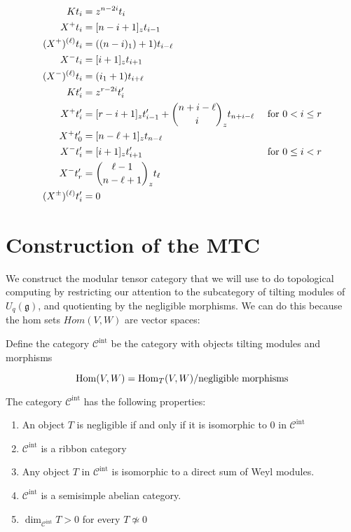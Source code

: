 \begin{align*}
    Kt_i &= z^{n-2i} t_i \\
    X^+ t_i &= [n-i+1]_z t_{i-1} \\
    (X^+)^{(\ell)} t_i &= ( (n-i)_1) + 1) t_{i-\ell} \\
    X^-t_i &= [i+1]_z t_{i+1} \\
    (X^-)^{(\ell)} t_i &= ( i_1 + 1) t_{i+\ell} \\
    Kt'_i &= z^{r-2i} t'_i \\
    X^+ t'_i &= [r-i+1]_z t'_{i-1}  + \dbinom{n + i - \ell}{i}_z t_{n+i-\ell} &\text{ for $0 < i \leq r$}\\
    X^+ t'_0 &= [n - \ell + 1]_z t_{n-\ell} \\
    X^-t'_i &= [i+1]_z t'_{i+1} &\text{ for $0 \leq i < r$}\\
    X^- t'_r &= \dbinom{\ell - 1}{n - \ell + 1}_z t_\ell \\
    (X^\pm)^{(\ell)} t'_i  &= 0
\end{align*}

\section{Construction of the MTC}
\label{MTC-construction}

We construct the modular tensor category that we will use to do topological
computing by restricting our attention to the subcategory of tilting modules of
$U_q(\mathfrak{g})$, and quotienting by the negligible morphisms. We can do
this because the hom sets $Hom(V,W)$ are vector spaces:

\begin{defn}
    Define the category $\mathcal{C}^\text{int}$ be the category with objects tilting modules and morphisms 

    \begin{equation*}
        \operatorname{Hom}(V,W) = \operatorname{Hom}_T(V,W) / \text{negligible morphisms}
    \end{equation*}

\end{defn}

The category $\mathcal{C}^\text{int}$ has the following properties:
\begin{enumerate}
    \item An object $T$ is negligible if and only if it is isomorphic to 0 in $\mathcal{C}^\text{int}$
    \item  $\mathcal{C}^\text{int}$ is a ribbon category
    \item Any object $T$ in $\mathcal{C}^\text{int}$ is isomorphic to a direct sum of Weyl modules.
    \item $\mathcal{C}^\text{int}$ is a semisimple abelian category. 
    \item $\dim_{\mathcal{C}^\text{int}} T > 0$ for every $T \not\simeq 0$
\end{enumerate}

